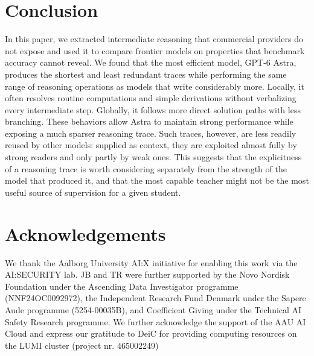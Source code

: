 \documentclass[10pt,letterpaper]{article}
\begin{document}
\section{Conclusion}
In this paper, we extracted intermediate reasoning that commercial providers do not expose and
used it to compare frontier models on properties that benchmark accuracy
cannot reveal. 
We found that the most efficient model, GPT-6 Astra,
produces the shortest and least redundant traces while performing the same range
of reasoning operations as models that write considerably more. Locally, it often
resolves routine computations and simple derivations without verbalizing every
intermediate step. Globally, it follows more direct solution paths with less
branching. These behaviors allow Astra to maintain strong performance
while exposing a much sparser reasoning trace. Such traces, however, are less
readily reused by other models: supplied as context, they are exploited almost
fully by strong readers and only partly by weak ones. This suggests that the
explicitness of a reasoning trace is worth considering separately from the
strength of the model that produced it, and that the most capable teacher might
not be the most useful source of supervision for a given student.


\section*{Acknowledgements}
We thank the Aalborg University AI:X initiative for
enabling this work via the AI:SECURITY lab.
JB and TR were further supported by the Novo Nordisk Foundation under the Ascending Data Investigator programme (NNF24OC0092972), the Independent Research Fund Denmark under the Sapere Aude programme (5254-00035B), and Coefficient Giving under the Technical AI Safety Research programme. We further acknowledge the support of the AAU AI Cloud and express our gratitude to DeiC for providing computing resources on the LUMI cluster (project nr. 465002249)







\end{document}
